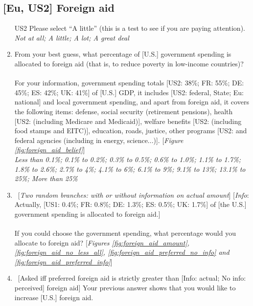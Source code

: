 \subsection*{[Eu, US2] Foreign aid}
\begin{enumerate}[resume] 
    \item [US2] Please select ``A little'' (this is a test to see if you are paying attention).
    \\ \textit{Not at all; A little; A lot; A great deal}
    \item \label{q:foreign_aid_belief} From your best guess, what percentage of [U.S.] government spending is allocated to foreign aid (that is, to reduce poverty in low-income countries)?\\
 \\
    For your information, government spending totals [US2: 38\%; FR: 55\%; DE: 45\%; ES: 42\%; UK: 41\%] of [U.S.] GDP, it includes [US2: federal, State; Eu: national] and local government spending, and apart from foreign aid, it covers the following items: defense, social security (retirement pensions), health [US2: (including Medicare and Medicaid)], welfare benefits [US2: (including food stamps and EITC)], education, roads, justice, other programs [US2: and federal agencies (including in energy, science...)]. [\textit{Figure \ref{fig:foreign_aid_belief}}]
   \\ \textit{Less than 0.1\%; 0.1\% to 0.2\%; 0.3\% to 0.5\%; 0.6\% to 1.0\%; 1.1\% to 1.7\%; 1.8\% to 2.6\%; 2.7\% to 4\%; 4.1\% to 6\%; 6.1\% to 9\%; 9.1\% to 13\%; 13.1\% to 25\%; More than 25\%}
   \item \label{q:foreign_aid_preferred} ~[\textit{Two random branches: with or without information on actual amount}] [\textit{Info}: Actually, [US1: 0.4\%; FR: 0.8\%; DE: 1.3\%; ES: 0.5\%; UK: 1.7\%] of [the U.S.] government spending is allocated to foreign aid.]\\
 \\
   If you could choose the government spending, what percentage would you allocate to foreign aid? [\textit{Figures \ref{fig:foreign_aid_amount}, \ref{fig:foreign_aid_no_less_all}, \ref{fig:foreign_aid_preferred_no_info} and \ref{fig:foreign_aid_preferred_info}}]
  \item \label{q:foreign_aid_raise_how} ~[Asked iff preferred foreign aid is strictly greater than [Info: actual; No info: perceived] foreign aid]  Your previous answer shows that you would like to increase [U.S.] foreign aid.\\
\\

\end{enumerate}
